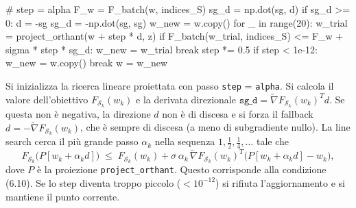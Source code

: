 \documentclass[italian, a4paper, twoside, binding=6mm]{sapthesis}
\begin{document}
\begin{pythoncode}[title= Newton-L1]

#
        step = alpha
        F_w = F_batch(w, indices_S)
        sg_d = np.dot(sg, d)
        if sg_d >= 0:
            d = -sg
            sg_d = -np.dot(sg, sg)
        w_new = w.copy()
        for _ in range(20):
            w_trial = project_orthant(w + step * d, z)
            if F_batch(w_trial, indices_S) <= F_w + sigma * step * sg_d:
                w_new = w_trial
                break
            step *= 0.5
            if step < 1e-12:
                w_new = w.copy()
                break
        w = w_new
\end{pythoncode}
Si inizializza la ricerca lineare proiettata con passo \texttt{step} = \texttt{alpha}. Si calcola il valore dell'obiettivo $F_{\mathcal{S}_k}(w_k)$ e la derivata direzionale $\texttt{sg\_d} = \widetilde{\nabla}F_{\mathcal{S}_k}(w_k)^T d$. Se questa non è negativa, la direzione $d$ non è di discesa e si forza il fallback $d = -\widetilde{\nabla}F_{\mathcal{S}_k}(w_k)$, che è sempre di discesa (a meno di subgradiente nullo). La line search cerca il più grande passo $\alpha_k$ nella sequenza $1,\frac12,\frac14,\dots$ tale che
\[
F_{\mathcal{S}_k}\bigl(P[w_k+\alpha_k d]\bigr) \;\le\; F_{\mathcal{S}_k}(w_k) + \sigma\,\alpha_k\,\widetilde{\nabla}F_{\mathcal{S}_k}(w_k)^T\bigl(P[w_k+\alpha_k d]-w_k\bigr),
\]
dove $P$ è la proiezione \texttt{project\_orthant}. Questo corrisponde alla condizione (6.10). Se lo step diventa troppo piccolo ($<10^{-12}$) si rifiuta l'aggiornamento e si mantiene il punto corrente.
\end{document}
